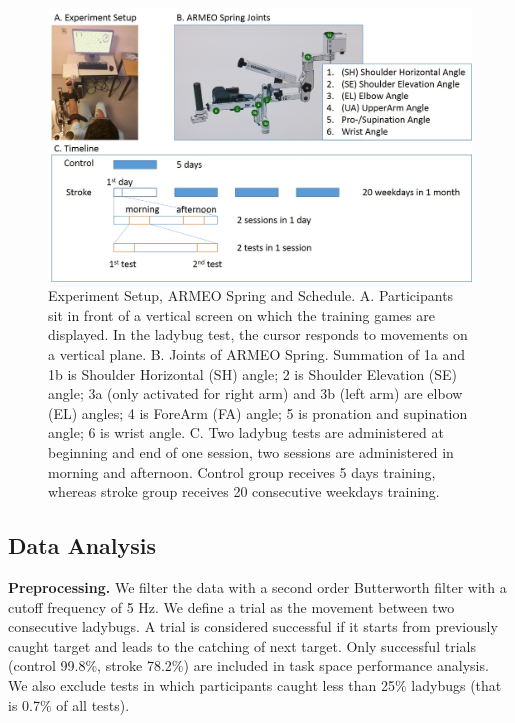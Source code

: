 \begin{figure}
	\centering
	\includegraphics[width=1\linewidth]{figures/1setup&schedule}
	\caption[Experiment Setup and Schedule]
	{Experiment Setup, ARMEO Spring and Schedule. 
		A. Participants sit in front of a vertical screen on which the training games are displayed. In the ladybug test, the cursor responds to movements on a vertical plane. 
		B. Joints of ARMEO Spring. Summation of 1a and 1b is Shoulder Horizontal (SH) angle; 2 is Shoulder Elevation (SE) angle; 3a (only activated for right arm) and 3b (left arm) are elbow (EL) angles; 4 is ForeArm (FA) angle; 5 is pronation and supination angle; 6 is wrist angle.
		C. Two ladybug tests are administered at beginning and end of one session, two sessions are administered in morning and afternoon. Control group receives 5 days training, whereas stroke group receives 20 consecutive weekdays training.}
	\label{fig:1setupschedule}
\end{figure}

\subsection{Data Analysis}

\textbf{Preprocessing.}
We filter the data with a second order Butterworth filter with a cutoff frequency of 5 Hz.
We define a trial as the movement between two consecutive ladybugs.
A trial is considered successful if it starts from previously caught target and leads to the catching of next target. 
Only successful trials (control 99.8\%, stroke 78.2\%) are included in task space performance analysis.
We also exclude tests in which participants caught less than 25\% ladybugs (that is 0.7\% of all tests).


